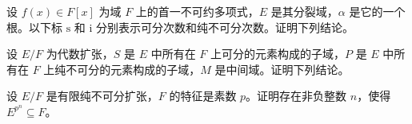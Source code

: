 \newpage
\noindent\begin{minipage}{\textwidth}
设 $f(x)\in F[x]$ 为域 $F$ 上的首一不可约多项式，$E$ 是其分裂域，$\alpha$ 是它的一个根。以下标 $\mathrm{s}$ 和 $\mathrm{i}$ 分别表示可分次数和纯不可分次数。证明下列结论。
\end{minipage}\par\vfill
\noindent\begin{minipage}{\textwidth}
设 $E/F$ 为代数扩张，$S$ 是 $E$ 中所有在 $F$ 上可分的元素构成的子域，$P$ 是 $E$ 中所有在 $F$ 上纯不可分的元素构成的子域，$M$ 是中间域。证明下列结论。
\end{minipage}\par\vfill
\noindent\begin{minipage}{\textwidth}
设 $E/F$ 是有限纯不可分扩张，$F$ 的特征是素数 $p$。证明存在非负整数 $n$，使得 $E^{p^n}\subseteq F$。
\end{minipage}\par\vfill
